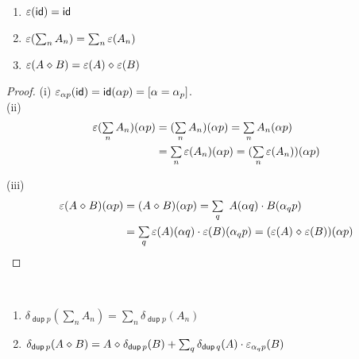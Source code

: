 \documentclass{article}
\renewcommand\smash{\mathrel{\diamond}}
\newcommand\ssum{\mathop{\textstyle\sum}}
\newcommand\sbigcup{\mathop{\textstyle\bigcup}}
\newcommand\pdup{\mathop{\mathsf{dup}}}
\newcommand\bval[1]{[#1]}
\renewcommand\star{^{\textstyle *}}
\newcommand\id{\mathsf{id}}
\begin{document}
\begin{lemma}\ 
\begin{enumerate}
\romanize
\item
$\eps(\id) = \id$
\item
$\eps(\ssum_n A_n) = \ssum_n \eps(A_n)$
\item
$\eps(A\smash B) = \eps(A)\smash\eps(B)$
\end{enumerate}
\end{lemma}

\begin{proof}
(i) $\eps_{\alpha p}(\id) = \id(\alpha p) = \bval{\alpha=\alpha_p}$.\\

(ii)
%
\begin{align*}
\eps(\ssum_n A_n)(\alpha p)
&= (\ssum_n A_n)(\alpha p)
= \ssum_n A_n(\alpha p)\\
&= \ssum_n \eps(A_n)(\alpha p)
= (\ssum_n\eps(A_n))(\alpha p)
\end{align*}

(iii)
%
\begin{align*}
\eps(A\smash B)(\alpha p)
&= (A\smash B)(\alpha p)
= \ssum_q\ A(\alpha q)\cdot B(\alpha_qp)\\
&= \ssum_q\eps(A)(\alpha q)\cdot\eps(B)(\alpha_qp)
= (\eps(A)\smash\eps(B))(\alpha p)
\end{align*}
%
\end{proof}

\begin{lemma}\ 
\begin{enumerate}
\romanize
\item
$\delta_{\pdup p}(\ssum_n A_n) = \ssum_n \delta_{\pdup p}(A_n)$
\item
$\delta_{\pdup p}(A\smash B) = A\smash\delta_{\pdup p}(B) + \ssum_{q}\delta_{\pdup q}(A)\cdot\eps_{\alpha_qp}(B)$
\end{enumerate}
\end{lemma}
\end{document}
